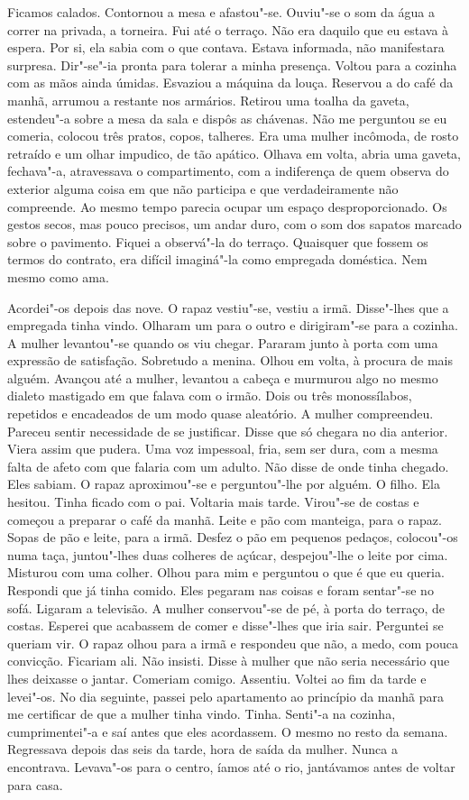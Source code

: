 Ficamos calados. Contornou a mesa e afastou"-se. Ouviu"-se o som da água
a correr na privada, a torneira. Fui até o terraço. Não era daquilo que
eu estava à espera. Por si, ela sabia com o que contava. Estava
informada, não manifestara surpresa. Dir"-se"-ia pronta para tolerar a
minha presença. Voltou para a cozinha com as mãos ainda úmidas.
Esvaziou a máquina da louça. Reservou a do café da manhã, arrumou a
restante nos armários. Retirou uma toalha da gaveta, estendeu"-a sobre a
mesa da sala e dispôs as chávenas. Não me perguntou se eu comeria,
colocou três pratos, copos, talheres. Era uma mulher incômoda, de rosto
retraído e um olhar impudico, de tão apático. Olhava em volta, abria uma
gaveta, fechava"-a, atravessava o compartimento, com a indiferença de
quem observa do exterior alguma coisa em que não participa e que
verdadeiramente não compreende. Ao mesmo tempo parecia ocupar um espaço
desproporcionado. Os gestos secos, mas pouco precisos, um andar duro,
com o som dos sapatos marcado sobre o pavimento. Fiquei a observá"-la do
terraço. Quaisquer que fossem os termos do contrato, era difícil
imaginá"-la como empregada doméstica. Nem mesmo como ama.

Acordei"-os depois das nove. O rapaz vestiu"-se, vestiu a irmã.
Disse"-lhes que a empregada tinha vindo. Olharam um para o outro e
dirigiram"-se para a cozinha. A mulher levantou"-se quando os viu
chegar. Pararam junto à porta com uma expressão de satisfação. Sobretudo
a menina. Olhou em volta, à procura de mais alguém. Avançou até a
mulher, levantou a cabeça e murmurou algo no mesmo dialeto mastigado em
que falava com o irmão. Dois ou três monossílabos, repetidos e
encadeados de um modo quase aleatório. A mulher compreendeu. Pareceu
sentir necessidade de se justificar. Disse que só chegara no dia
anterior. Viera assim que pudera. Uma voz impessoal, fria, sem ser dura,
com a mesma falta de afeto com que falaria com um adulto. Não disse de
onde tinha chegado. Eles sabiam. O rapaz aproximou"-se e perguntou"-lhe
por alguém. O filho. Ela hesitou. Tinha ficado com o pai. Voltaria mais
tarde. Virou"-se de costas e começou a preparar o café da manhã. Leite
e pão com manteiga, para o rapaz. Sopas de pão e leite, para a irmã.
Desfez o pão em pequenos pedaços, colocou"-os numa taça, juntou"-lhes
duas colheres de açúcar, despejou"-lhe o leite por cima. Misturou com
uma colher. Olhou para mim e perguntou o que é que eu queria. Respondi
que já tinha comido. Eles pegaram nas coisas e foram sentar"-se no sofá.
Ligaram a televisão. A mulher conservou"-se de pé, à porta do terraço,
de costas. Esperei que acabassem de comer e disse"-lhes que iria sair.
Perguntei se queriam vir. O rapaz olhou para a irmã e respondeu que não,
a medo, com pouca convicção. Ficariam ali. Não insisti. Disse à mulher
que não seria necessário que lhes deixasse o jantar. Comeriam comigo.
Assentiu. Voltei ao fim da tarde e levei"-os. No dia seguinte, passei
pelo apartamento ao princípio da manhã para me certificar de que a
mulher tinha vindo. Tinha. Senti"-a na cozinha, cumprimentei"-a e saí
antes que eles acordassem. O mesmo no resto da semana. Regressava depois
das seis da tarde, hora de saída da mulher. Nunca a encontrava.
Levava"-os para o centro, íamos até o rio, jantávamos antes de voltar
para casa.

